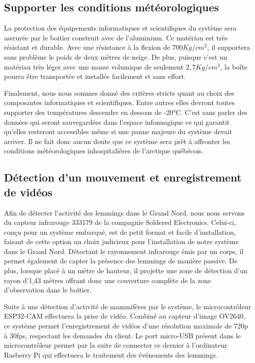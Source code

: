 \subsection{Supporter les conditions météorologiques}
La protection des équipements informatiques et scientifiques du système sera assrurée par le boitier construit avec de l'aluminium. Ce matériau est très résistant et durable.
Avec une résistance à la flexion de $700 Kg/cm^2$, il supportera sans problème le poids de deux mètres de neige. De plus, puisque c'est un matériau très léger avec une
masse volumique de seulement $2,7Kg/cm^3$, la boîte pourra être transportée et installée facilement et sans effort.

\bigskip
Finalement, nous nous sommes donné des critères stricts quant au choix des composantes informatiques et scientifiques. Entre autres elles devront toutes 
supporter des températures descendre en dessous de -20°C. C'est sans parler des données qui seront sauvegardées dans l'espace infonuagique ce qui garantit qu'elles resteront
accessibles même si une panne majeure du système devait arriver. Il ne fait donc aucun doute que ce système sera prêt à affronter les conditions 
météorologiques inhospitalières de l'arctique québécois.

\subsection{Détection d'un mouvement et enregistrement de vidéos}
Afin de détecter l’activité des lemmings dans le Grand Nord, nous nous servons du capteur infrarouge 333179 de la compagnie Soldered Electronics. 
Celui-ci, conçu pour un système embarqué, est de petit format et facile d'installation, faisant de cette option un choix judicieux pour l’installation de notre système dans le 
Grand Nord. Détectant le rayonnement infrarouge émis par un corps, il permet également de capter la présence des lemmings de manière passive. De plus, lorsque placé à un mètre de 
hauteur, il projette une zone de détection d’un rayon d’1,43 mètres offrant donc une couverture complète de la zone d’observation dans le boîtier.

\bigskip
Suite à une détection d’activité de mammifères par le système, le microcontrôleur ESP32-CAM effectuera la prise de vidéo. Combiné au capteur d’image OV2640, ce système permet 
l’enregistrement de vidéos d’une résolution maximale de 720p à 30fps, respectant les demandes du client. Le port micro-USB présent dans le microcontrôleur permet par la suite 
de connecter ce dernier à l’ordinateur Rasberry Pi qui effectuera le traitement des événements des lemmings.


